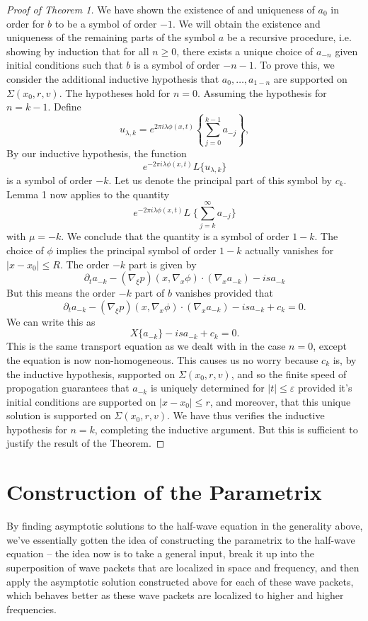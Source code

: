 \documentclass{article}
\theoremstyle{plain}
\theoremstyle{remark}
\theoremstyle{definition}
\begin{document}
\begin{proof}[Proof of Theorem 1]
We have shown the existence of and uniqueness of $a_0$ in order for $b$ to be a symbol of order $-1$. We will obtain the existence and uniqueness of the remaining parts of the symbol $a$ be a recursive procedure, i.e. showing by induction that for all $n \geq 0$, there exists a unique choice of $a_{-n}$ given initial conditions such that $b$ is a symbol of order $-n-1$. To prove this, we consider the additional inductive hypothesis that $a_0, \dots, a_{1-n}$ are supported on $\Sigma(x_0,r,v)$. The hypotheses hold for $n = 0$. Assuming the hypothesis for $n = k-1$. Define
%
\[ u_{\lambda,k} = e^{2 \pi i \lambda \phi(x,t)} \left\{ \sum_{j = 0}^{k-1} a_{-j} \right\}, \]
%
By our inductive hypothesis, the function
%
\[ e^{-2 \pi i \lambda \phi(x,t)} L \{ u_{\lambda,k} \} \]
%
is a symbol of order $-k$. Let us denote the principal part of this symbol by $c_k$. Lemma 1 now applies to the quantity
%
\[ e^{-2 \pi i \lambda \phi(x,t)} L\; \Big\{ \sum_{j = k}^\infty a_{-j} \Big\} \]
%
with $\mu = -k$. We conclude that the quantity is a symbol of order $1 - k$. The choice of $\phi$ implies the principal symbol of order $1-k$ actually vanishes for $|x - x_0| \leq R$. The order $-k$ part is given by
%
\[ \partial_t a_{-k} - (\nabla_\xi p)(x, \nabla_x \phi) \cdot (\nabla_x a_{-k}) - i s a_{-k} \]
%
But this means the order $-k$ part of $b$ vanishes provided that
%
\[ \partial_t a_{-k} - (\nabla_\xi p)(x, \nabla_x \phi) \cdot (\nabla_x a_{-k}) - i s a_{-k} + c_k = 0. \]
%
We can write this as
%
\[ X \{ a_{-k} \} - i s a_{-k} + c_k = 0. \]
%
This is the same transport equation as we dealt with in the case $n = 0$, except the equation is now non-homogeneous. This causes us no worry because $c_k$ is, by the inductive hypothesis, supported on $\Sigma(x_0,r,v)$, and so the finite speed of propogation guarantees that $a_{-k}$ is uniquely determined for $|t| \leq \varepsilon$ provided it's initial conditions are supported on $|x -  x_0| \leq r$, and moreover, that this unique solution is supported on $\Sigma(x_0,r,v)$. We have thus verifies the inductive hypothesis for $n = k$, completing the inductive argument. But this is sufficient to justify the result of the Theorem. \qedhere

\end{proof}

\section{Construction of the Parametrix}

By finding asymptotic solutions to the half-wave equation in the generality above, we've essentially gotten the idea of constructing the parametrix to the half-wave equation -- the idea now is to take a general input, break it up into the superposition of wave packets that are localized in space and frequency, and then apply the asymptotic solution constructed above for each of these wave packets, which behaves better as these wave packets are localized to higher and higher frequencies.
\end{document}
